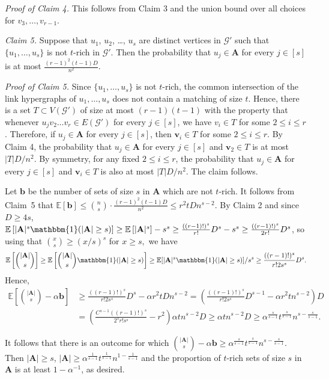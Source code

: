 \documentclass[a4paper,11pt]{article}
\makeatletter
\renewenvironment{proof}[1][\proofname] {\par\pushQED{\qed}\normalfont\topsep6\p@\@plus6\p@\relax\trivlist\item[\hskip\labelsep\bfseries#1\@addpunct{.}]\ignorespaces}{\popQED\endtrivlist\@endpefalse}
\theoremstyle{definition}
\def\vb{\textbf{b}}
\def\vv{\textbf{v}}
\def\vA{\textbf{A}}
\def\cG{\mathcal{G}}
\makeatother
\begin{document}
\begin{proof}[Proof of Theorem \ref{thm:dependent random choice}]
\noindent \emph{Proof of Claim 4.} This follows from Claim 3 and the union bound over all choices for $v_3,\dots,v_{r-1}$.

\medskip

\noindent \emph{Claim 5.} Suppose that $u_1$, $u_2$, \dots, $u_s$ are distinct vertices in $\cG'$ such that $\{u_1,\dots,u_s\}$ is not $t$-rich in $\cG'$. Then the probability that $u_j\in \vA$ for every $j\in [s]$ is at most $\frac{(r-1)^2(t-1)D}{n^2}$.

\medskip

\noindent \emph{Proof of Claim 5.} Since $\{u_1,\dots,u_s\}$ is not $t$-rich, the common intersection of the link hypergraphs of $u_1, \dots, u_s$ does not contain a matching of size $t$. Hence, there is a set $T\subset V(\cG')$ of size at most $(r-1)(t-1)$ with the property that whenever $u_jv_2\dots v_r\in E(\cG')$ for every $j\in [s]$, we have $v_i\in T$ for some $2\leq i\leq r$. Therefore, if $u_j\in \vA$ for every $j\in [s]$, then $\vv_i\in T$ for some $2\leq i\leq r$. By Claim 4, the probability that $u_j\in \vA$ for every $j\in [s]$ and $\vv_2\in T$ is at most $|T|D/n^2$. By symmetry, for any fixed $2\leq i\leq r$, the probability that $u_j\in \vA$ for every $j\in [s]$ and $\vv_i\in T$ is also at most $|T|D/n^2$. The claim follows.

\medskip

Let $\vb$ be the number of sets of size $s$ in $\vA$ which are not $t$-rich. It follows from Claim~5 that $\mathbb{E}[\vb]\leq \binom{n}{s}\cdot \frac{(r-1)^2 (t-1) D}{n^2}\leq r^2 t D n^{s-2}$. By Claim 2 and since $D\geq 4s$, $\mathbb{E}\left[|\vA|^s\mathbbm{1}(|\vA|\geq s)\right]\geq \mathbb{E}\left[|\vA|^s\right]-s^s\geq \frac{((r-1)!)^s}{r!}D^s-s^s\geq \frac{((r-1)!)^s}{2r!}D^s$, so using that $\binom{x}{s} \ge (x/s)^s$ for $x \ge s,$ we have 
$$\mathbb{E}\left[\binom{|\vA|}{s}\right]\geq \mathbb{E}\left[\binom{|\vA|}{s}\mathbbm{1}(|\vA|\geq s)\right]\geq \mathbb{E}[|\vA|^s \mathbbm{1}(|\vA|\geq s)]/s^s\geq \frac{((r-1)!)^s}{r!2s^s}D^s.$$
Hence,
\begin{align*}
    \mathbb{E}\left[\binom{|\vA|}{s}-\alpha \vb\right]
    &\geq \frac{((r-1)!)^s}{r!2s^s}D^s-\alpha r^2 t D n^{s-2}=\left(\frac{((r-1)!)^s}{r!2s^s}D^{s-1}-\alpha r^2 t n^{s-2}\right)D \\
    &=\left(\frac{C^{s-1}((r-1)!)^s}{2^{s}r!s^s}-r^2\right)\alpha t n^{s-2} D\geq \alpha t n^{s-2} D \geq \alpha^{\frac{s}{s-1}} t^{\frac{s}{s-1}} n^{s-\frac{s}{s-1}}.
\end{align*}

It follows that there is an outcome for which $\binom{|\vA|}{s}-\alpha \vb\geq \alpha^{\frac{s}{s-1}} t^{\frac{s}{s-1}} n^{s-\frac{s}{s-1}}$. Then $|\vA|\geq s$, $|\vA|\geq \alpha^{\frac{1}{s-1}}t^{\frac{1}{s-1}}n^{1-\frac{1}{s-1}}$ and the proportion of $t$-rich sets of size $s$ in $\vA$ is at least $1-\alpha^{-1}$, as desired.
\end{proof}
\end{document}
